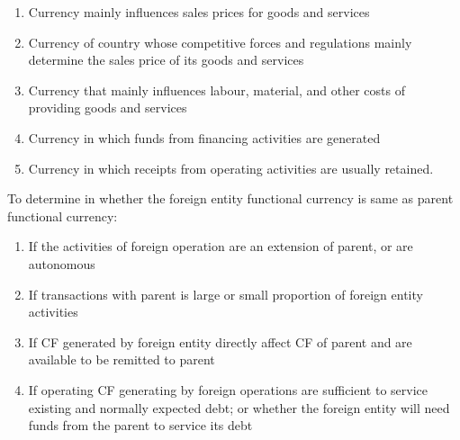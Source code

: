 \begin{method} 
\begin{enumerate}[label=\roman*.]
\setlength{\itemsep}{0pt}
\item Currency mainly influences sales prices for goods and services
\item Currency of country whose competitive forces and regulations mainly determine the sales price of its goods and services
\item Currency that mainly influences labour, material, and other costs of providing goods and services
\item Currency in which funds from financing activities are generated
\item Currency in which receipts from operating activities are usually retained.
\end{enumerate}
To determine in whether the foreign entity functional currency is same as parent functional currency:
\begin{enumerate}[label=\roman*.]
\setlength{\itemsep}{0pt}
\item If the activities of foreign operation are an extension of parent, or are autonomous
\item If transactions with parent is large or small proportion of foreign entity activities
\item If CF generated by foreign entity directly affect CF of parent and are available to be remitted to parent
\item If operating CF generating by foreign operations are sufficient to service existing and normally expected debt; or whether the foreign entity will need funds from the parent to service its debt
\end{enumerate}
\end{method}

